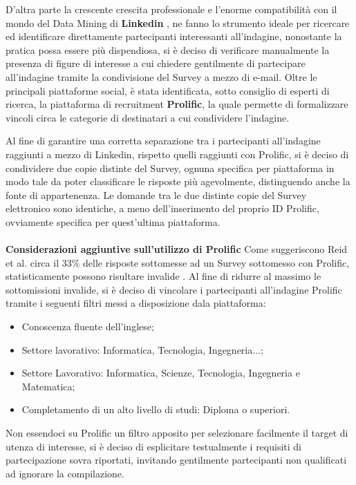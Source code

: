     D'altra parte la crescente crescita professionale e l'enorme compatibilità con il mondo del Data Mining di \textbf{Linkedin} \cite{sumbaly2013big}, ne fanno lo strumento ideale per ricercare ed identificare direttamente partecipanti interessanti all'indagine, nonostante la pratica possa essere più dispendiosa, si è deciso di verificare manualmente la presenza di figure di interesse a cui chiedere gentilmente di partecipare all'indagine tramite la condivisione del Survey a mezzo di e-mail.  Oltre le principali piattaforme social, è stata identificata, sotto consiglio di esperti di ricerca, la piattaforma di recruitment \textbf{Prolific}, la quale permette di formalizzare vincoli circa le categorie di destinatari a cui condividere l'indagine. 
    
    Al fine di garantire una corretta separazione tra i partecipanti all'indagine raggiunti a mezzo di Linkedin, rispetto quelli raggiunti con Prolific, si è deciso di condividere due copie distinte del Survey, ognuna specifica per piattaforma in modo tale da poter classificare le risposte più agevolmente, distinguendo anche la fonte di appartenenza. Le domande tra le due distinte copie del Survey elettronico sono identiche, a meno dell'inserimento del proprio ID Prolific, ovviamente specifica per quest'ultima piattaforma.\\\\
    
    \textbf{Considerazioni aggiuntive sull'utilizzo di Prolific}
    Come suggeriscono Reid et al. circa il 33\% delle risposte sottomesse ad un Survey sottomesso con Prolific, statisticamente possono risultare invalide \cite{reid2022software}. Al fine di ridurre al massimo le sottomissioni invalide, si è deciso di vincolare i partecipanti all'indagine Prolific tramite i seguenti filtri messi a disposizione dala piattaforma:
    
    \begin{itemize}
        \item Conoscenza fluente dell'inglese;
        \item Settore lavorativo: Informatica, Tecnologia, Ingegneria...;
        \item Settore Lavorativo: Informatica, Scienze, Tecnologia, Ingegneria e Matematica;
        \item Completamento di un alto livello di studi: Diploma o superiori.
    \end{itemize}
    
    Non essendoci su Prolific un filtro apposito per selezionare facilmente il target di utenza di interesse, si è deciso di esplicitare testualmente i requisiti di partecipazione sovra riportati, invitando gentilmente partecipanti non qualificati ad ignorare la compilazione. 
    
